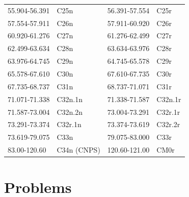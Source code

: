 \begin{center}
\begin{longtable}{ll|ll}
55.904-56.391 & C25n & 56.391-57.554 & C25r\\
57.554-57.911 & C26n & 57.911-60.920 & C26r\\
60.920-61.276 & C27n & 61.276-62.499 & C27r\\
62.499-63.634 & C28n & 63.634-63.976 & C28r\\
63.976-64.745 & C29n & 64.745-65.578 & C29r\\
65.578-67.610 & C30n & 67.610-67.735 & C30r\\
67.735-68.737 & C31n & 68.737-71.071 & C31r\\
71.071-71.338 & C32n.1n & 71.338-71.587 & C32n.1r\\
71.587-73.004 & C32n.2n & 73.004-73.291 & C32r.1r\\
73.291-73.374 & C32r.1n & 73.374-73.619 & C32r.2r\\
73.619-79.075 & C33n & 79.075-83.000 & C33r\\
83.00-120.60 & C34n (CNPS) & 120.60-121.00 & CM0r\\
\end{longtable}
\end{center}




\section{Problems}

